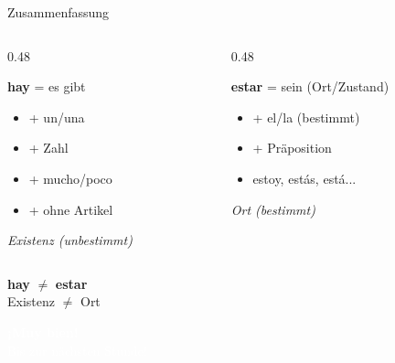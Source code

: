 \documentclass[aspectratio=169, 11pt]{beamer}
\newcommand{\es}[1]{\textbf{\textcolor{spanischrot}{#1}}}
\newcommand{\de}[1]{{\small\textcolor{dunkelgrau}{\textit{#1}}}}
\newcommand{\estar}[1]{\textbf{\textcolor{blau}{#1}}}
\begin{document}
\begin{frame}{Zusammenfassung}

\begin{columns}[T]
\begin{column}{0.48\textwidth}
\begin{block}{\es{hay} = es gibt}
\begin{itemize}
    \item + un/una
    \item + Zahl
    \item + mucho/poco
    \item + ohne Artikel
\end{itemize}
\de{Existenz (unbestimmt)}
\end{block}
\end{column}

\begin{column}{0.48\textwidth}
\begin{block}{\estar{estar} = sein (Ort/Zustand)}
\begin{itemize}
    \item + el/la (bestimmt)
    \item + Präposition
    \item estoy, estás, está...
\end{itemize}
\de{Ort (bestimmt)}
\end{block}
\end{column}
\end{columns}

\vspace{0.5cm}

\begin{center}
{\Large \es{hay} $\neq$ \estar{estar}}\\[0.3em]
{\small Existenz $\neq$ Ort}
\end{center}

\end{frame}

\begin{frame}
\begin{center}
\vspace{2cm}
{\Huge\bfseries\textcolor{white}{¡Muy bien!}}\\[1cm]
{\Large\textcolor{white}{Bis zur nächsten Stunde!}}
\end{center}
\end{frame}
\end{document}
